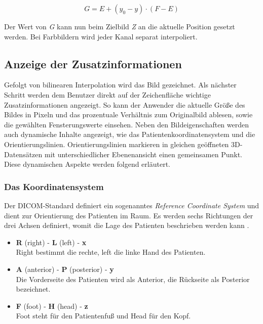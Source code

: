 \begin{equation}
G = E + (y_0 - y) \cdot (F-E)
\end{equation}

Der Wert von \textit{G} kann nun beim Zielbild \textit{Z} an die aktuelle Position gesetzt werden. Bei Farbbildern wird jeder Kanal separat interpoliert.

\subsection{Anzeige der Zusatzinformationen}

Gefolgt von bilinearen Interpolation wird das Bild gezeichnet. Als nächster Schritt werden dem Benutzer direkt auf der Zeichenfläche wichtige Zusatzinformationen angezeigt. So kann der Anwender die aktuelle Größe des Bildes in Pixeln und das prozentuale Verhältnis zum Originalbild ablesen, sowie die gewählten Fensterungswerte einsehen. Neben den Bildeigenschaften werden auch dynamische Inhalte angezeigt, wie das Patientenkoordinatensystem und die Orientierungslinien. Orientierungslinien markieren in gleichen geöffneten 3D-Datensätzen mit unterschiedlicher Ebenenansicht einen gemeinsamen Punkt. Diese dynamischen Aspekte werden folgend erläutert.

\subsubsection{Das Koordinatensystem}

Der DICOM-Standard definiert ein sogenanntes \textit{Reference Coordinate System} \cite[S. 55]{dicom:iod} und dient zur Orientierung des Patienten im Raum. Es werden sechs Richtungen der drei Achsen definiert, womit die Lage des Patienten beschrieben werden kann \cite[C.7.6.1.1.1]{dicom:iod}. 

\begin{itemize}
\item \textbf{R} (right) - \textbf{L} (left) - \textbf{x} \\
	Right bestimmt die rechte, left die linke Hand des Patienten.
\item \textbf{A} (anterior) - \textbf{P} (posterior) - \textbf{y} \\
   Die Vorderseite des Patienten wird als Anterior, die Rückseite als Posterior bezeichnet.
\item \textbf{F} (foot) - \textbf{H} (head) - \textbf{z} \\
 Foot steht für den Patientenfuß und Head für den Kopf.
\end{itemize}

